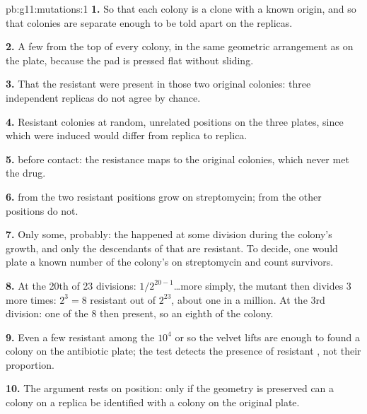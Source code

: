 \begin{solution}{pb:g11:mutations:1}
\textbf{1.} So that each colony is a clone with a known origin, and so
that colonies are separate enough to be told apart on the replicas.

\textbf{2.} A few  from the top of every colony, in the same
geometric arrangement as on the plate, because the pad is pressed flat
without sliding.

\textbf{3.} That the resistant  were present in those two
original colonies: three independent replicas do not agree by chance.

\textbf{4.} Resistant colonies at random, unrelated positions on the
three plates, since which  were induced would differ from replica
to replica.

\textbf{5.}  before contact: the resistance maps to the
original colonies, which never met the drug.

\textbf{6.}  from the two resistant positions grow on
streptomycin;  from the other positions do not.

\textbf{7.} Only some, probably: the  happened at some division
during the colony's growth, and only the descendants of that  are
resistant. To decide, one would plate a known number of the colony's
 on streptomycin and count survivors.

\textbf{8.} At the 20th of 23 divisions: $1/2^{20-1}$\dots more
simply, the mutant  then divides 3 more times: $2^3 = 8$ resistant
 out of $2^{23}$, about one in a million. At the 3rd division:
one of the 8  then present, so an eighth of the colony.

\textbf{9.} Even a few resistant  among the $10^4$ or so the
velvet lifts are enough to found a colony on the antibiotic plate; the
test detects the presence of resistant , not their proportion.

\textbf{10.} The argument rests on position: only if the geometry is
preserved can a colony on a replica be identified with a colony on
the original plate.


\end{solution}
